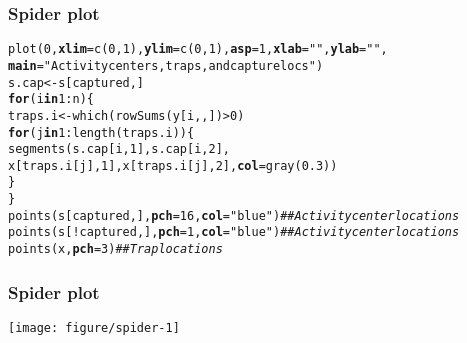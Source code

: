 \documentclass[color=usenames,dvipsnames]{beamer}\usepackage[]{graphicx}\usepackage[]{color}
\makeatletter
\newcommand{\hlnum}[1]{\textcolor[rgb]{0.69,0.494,0}{#1}}%
\newcommand{\hlstr}[1]{\textcolor[rgb]{0.749,0.012,0.012}{#1}}%
\newcommand{\hlcom}[1]{\textcolor[rgb]{0.514,0.506,0.514}{\textit{#1}}}%
\newcommand{\hlopt}[1]{\textcolor[rgb]{0,0,0}{#1}}%
\newcommand{\hlstd}[1]{\textcolor[rgb]{0,0,0}{#1}}%
\newcommand{\hlkwa}[1]{\textcolor[rgb]{0,0,0}{\textbf{#1}}}%
\newcommand{\hlkwb}[1]{\textcolor[rgb]{0,0.341,0.682}{#1}}%
\newcommand{\hlkwc}[1]{\textcolor[rgb]{0,0,0}{\textbf{#1}}}%
\newcommand{\hlkwd}[1]{\textcolor[rgb]{0.004,0.004,0.506}{#1}}%
\newenvironment{kframe}{%
 \def\at@end@of@kframe{}%
 \ifinner\ifhmode%
  \def\at@end@of@kframe{\end{minipage}}%
  \begin{minipage}{\columnwidth}%
 \fi\fi%
 \def\FrameCommand##1{\hskip\@totalleftmargin \hskip-\fboxsep
 \colorbox{shadecolor}{##1}\hskip-\fboxsep
     \hskip-\linewidth \hskip-\@totalleftmargin \hskip\columnwidth}%
 \MakeFramed {\advance\hsize-\width
   \@totalleftmargin\z@ \linewidth\hsize
   \@setminipage}}%
 {\par\unskip\endMakeFramed%
 \at@end@of@kframe}
\newenvironment{knitrout}{}{} %
\makeatother
\begin{document}
\begin{frame}[fragile]
  \frametitle{Spider plot}
\begin{knitrout}\scriptsize
{}\color{fgcolor}\begin{kframe}
\begin{alltt}
\hlkwd{plot}\hlstd{(}\hlnum{0}\hlstd{,} \hlkwc{xlim}\hlstd{=}\hlkwd{c}\hlstd{(}\hlnum{0}\hlstd{,}\hlnum{1}\hlstd{),} \hlkwc{ylim}\hlstd{=}\hlkwd{c}\hlstd{(}\hlnum{0}\hlstd{,}\hlnum{1}\hlstd{),} \hlkwc{asp}\hlstd{=}\hlnum{1}\hlstd{,} \hlkwc{xlab}\hlstd{=}\hlstr{""}\hlstd{,} \hlkwc{ylab}\hlstd{=}\hlstr{""}\hlstd{,}
     \hlkwc{main}\hlstd{=}\hlstr{"Activity centers, traps, and capture locs"}\hlstd{)}
\hlstd{s.cap} \hlkwb{<-} \hlstd{s[captured,]}
\hlkwa{for}\hlstd{(i} \hlkwa{in} \hlnum{1}\hlopt{:}\hlstd{n) \{}
    \hlstd{traps.i} \hlkwb{<-} \hlkwd{which}\hlstd{(}\hlkwd{rowSums}\hlstd{(y[i,,])}\hlopt{>}\hlnum{0}\hlstd{)}
    \hlkwa{for}\hlstd{(j} \hlkwa{in} \hlnum{1}\hlopt{:}\hlkwd{length}\hlstd{(traps.i)) \{}
        \hlkwd{segments}\hlstd{(s.cap[i,}\hlnum{1}\hlstd{], s.cap[i,}\hlnum{2}\hlstd{],}
                 \hlstd{x[traps.i[j],}\hlnum{1}\hlstd{], x[traps.i[j],}\hlnum{2}\hlstd{],} \hlkwc{col}\hlstd{=}\hlkwd{gray}\hlstd{(}\hlnum{0.3}\hlstd{))}
    \hlstd{\}}
\hlstd{\}}
\hlkwd{points}\hlstd{(s[captured,],} \hlkwc{pch}\hlstd{=}\hlnum{16}\hlstd{,} \hlkwc{col}\hlstd{=}\hlstr{"blue"}\hlstd{)} \hlcom{## Activity center locations}
\hlkwd{points}\hlstd{(s[}\hlopt{!}\hlstd{captured,],} \hlkwc{pch}\hlstd{=}\hlnum{1}\hlstd{,} \hlkwc{col}\hlstd{=}\hlstr{"blue"}\hlstd{)} \hlcom{## Activity center locations}
\hlkwd{points}\hlstd{(x,} \hlkwc{pch}\hlstd{=}\hlnum{3}\hlstd{)}                         \hlcom{## Trap locations}
\end{alltt}
\end{kframe}
\end{knitrout}
\end{frame}


\begin{frame}
  \frametitle{Spider plot}
  \centering
  \texttt{[image: figure/spider-1]} \\
\end{frame}
\end{document}
